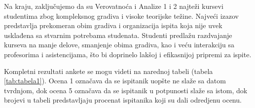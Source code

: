\documentclass[a4paper]{article}
\begin{document}
Na kraju, zaključujemo da su Verovatnoća i Analize 1 i 2 najteži kursevi studentima zbog kompleksnog gradiva i visoke teorijske težine. Najveći izazov predstavlja prekomeran obim gradiva i organizacija ispita koja nije uvek usklađena sa stvarnim potrebama studenata. Studenti predlažu razdvajanje kurseva na manje delove, smanjenje obima gradiva, kao i veću interakciju sa profesorima i asistencijama, što bi doprinelo lakšoj i efikasnijoj pripremi za ispite.

\vspace{7mm}

Kompletni rezultati ankete se mogu videti na narednoj tabeli (tabela \ref{tab:tabela1}). Ocena 1 označava da se ispitanik uopšte ne slaže sa datom tvrdnjom, dok ocena 5 označava da se ispitanik u potpunosti slaže sa istom, dok brojevi u tabeli predstavljaju procenat ispitanika koji su dali odredjenu ocenu.

\begin{table}[h!]
\begin{center}
\end{center}
\caption{\centering Rezultati ankete}
\label{tab:tabela1}
\end{table}
\end{document}
